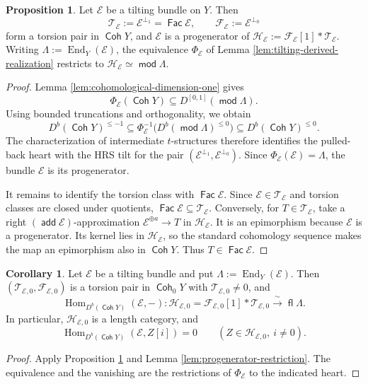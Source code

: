 \documentclass[a4paper,reqno]{amsart}
\def\E{\mathcal{E}}
\def\F{\mathcal{F}}
\def\H{\mathcal{H}}
\def\T{\mathcal{T}}
\def\La{\Lambda}
\DeclareMathOperator{\md}{\mathsf{mod}}
\renewcommand{\mod}{\md}
\DeclareMathOperator{\fl}{\mathsf{fl}}
\DeclareMathOperator{\add}{\mathsf{add}}
\DeclareMathOperator{\Fac}{\mathsf{Fac}}
\DeclareMathOperator{\Coh}{\mathsf{Coh}}
\DeclareMathOperator{\Hom}{Hom}
\DeclareMathOperator{\End}{End}
\theoremstyle{definition}
\newtheorem{Prop}[Thm]{Proposition}
\newtheorem{Cor}[Thm]{Corollary}
\begin{document}
\begin{Prop}\label{prop:bundle-to-torsion}
Let $\E$ be a tilting bundle on $Y$. Then
\[
\T_{\E}:=\E^{\perp_1}=\Fac\E,
\qquad\F_{\E}:=\E^{\perp_0}
\]
form a torsion pair in $\Coh Y$, and $\E$ is a progenerator of $\H_{\E}:=\F_{\E}[1]*\T_{\E}$. Writing $\La:=\End_Y(\E)$, the equivalence $\Phi_{\E}$ of Lemma \ref{lem:tilting-derived-realization} restricts to $\H_{\E}\simeq\mod\La$.
\end{Prop}
\begin{proof}
Lemma \ref{lem:cohomological-dimension-one} gives
\[
\Phi_{\E}(\Coh Y)\subseteq D^{[0,1]}(\mod\La).
\]
Using bounded truncations and orthogonality, we obtain
\[
D^b(\Coh Y)^{\le-1}
\subseteq\Phi_{\E}^{-1}\bigl(D^b(\mod\La)^{\le0}\bigr)
\subseteq D^b(\Coh Y)^{\le0}.
\]
The characterization of intermediate $t$-structures \cite[Lemma 1.1.2]{Pol07} therefore identifies the pulled-back heart with the HRS tilt for the pair $(\E^{\perp_1},\E^{\perp_0})$. Since $\Phi_{\E}(\E)=\La$, the bundle $\E$ is its progenerator.

It remains to identify the torsion class with $\Fac\E$. Since $\E\in\T_{\E}$ and torsion classes are closed under quotients, $\Fac\E\subseteq\T_{\E}$. Conversely, for $T\in\T_{\E}$, take a right $(\add\E)$-approximation $\E^{\oplus a}\to T$ in $\H_{\E}$. It is an epimorphism because $\E$ is a progenerator. Its kernel lies in $\H_{\E}$, so the standard cohomology sequence makes the map an epimorphism also in $\Coh Y$. Thus $T\in\Fac\E$.
\end{proof}

\begin{Cor}\label{lem:tilting-restricts-to-length}
Let $\E$ be a tilting bundle and put $\La:=\End_Y(\E)$. Then $(\T_{\E,0},\F_{\E,0})$ is a torsion pair in $\Coh_0Y$ with $\T_{\E,0}\ne0$, and
\[
\Hom_{D^b(\Coh Y)}(\E,-)\colon
\H_{\E,0}=\F_{\E,0}[1]*\T_{\E,0}\xrightarrow{\ \sim\ }\fl\La.
\]
In particular, $\H_{\E,0}$ is a length category, and
\begin{equation}\label{eq:finite-heart-orthogonality}
\Hom_{D^b(\Coh Y)}(\E,Z[i])=0
\qquad(Z\in\H_{\E,0},\ i\ne0).
\end{equation}
\end{Cor}
\begin{proof}
Apply Proposition \ref{prop:bundle-to-torsion} and Lemma \ref{lem:progenerator-restriction}. The equivalence and the vanishing are the restrictions of $\Phi_{\E}$ to the indicated heart.
\end{proof}

\end{document}
